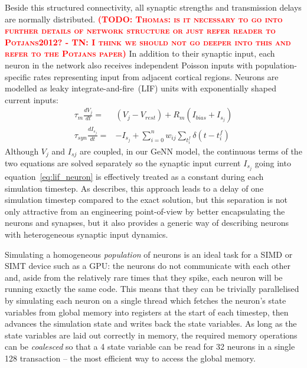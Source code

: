 \documentclass[utf8]{frontiersSCNS} %
\newcommand{\todo}[1]{\textbf{\textsc{\textcolor{red}{(TODO: #1)}}}}
\begin{document}
Beside this structured connectivity, all synaptic strengths and transmission delays are normally distributed.
\todo{Thomas: is it necessary to go into further details of network structure or just refer reader to Potjans2012? - TN: I think we should not go deeper into this and refer to the Potjans paper}
In addition to their synaptic input, each neuron in the network also receives independent Poisson inputs with population-specific rates representing input from adjacent cortical regions.
Neurons are modelled as leaky integrate-and-fire~(LIF) units with exponentially shaped current inputs:
%
\begin{align}
    \tau_{m} \frac{dV_{j}}{dt} = & (V_{j} - V_{rest}) + R_{m}(I_{bias} + I_{s_{j}}) \label{eq:lif_neuron}\\
    \tau_{syn} \frac{dI_{s_{j}}}{dt} = & -I_{s_{j}} + \sum_{i=0}^{n} w_{ij} \sum_{t_{i}^{f}}  \delta(t - t_{i}^{f})\label{eq:exp_neuron_input_current}
\end{align}
%
Although $V_{j}$ and $I_{s{j}}$ are coupled, in our GeNN model, the continuous terms of the two equations are solved separately so the synaptic input current $I_{s_{j}}$ going into equation~\ref{eq:lif_neuron} is effectively treated as a constant during each simulation timestep.
As \citet{Rotter1999} describes, this approach leads to a delay of one simulation timestep compared to the exact solution, but this separation is not only attractive from an engineering point-of-view by better encapsulating the neurons and synapses, but it also provides a generic way of describing neurons with heterogeneous synaptic input dynamics.

Simulating a homogeneous \textit{population} of neurons is an ideal task for a SIMD or SIMT device such as a GPU: the neurons do not communicate with each other and, aside from the relatively rare times that they spike, each neuron will be running exactly the same code.
This means that they can be trivially parallelised by simulating each neuron on a single thread which fetches the neuron's state variables from global memory into registers at the start of each timestep, then advances the simulation state and writes back the state variables.
As long as the state variables are laid out correctly in memory, the required memory operations can be \textit{coalesced} so that a \SI{4}{\byte} state variable can be read for \num{32} neurons in a single \SI{128}{\byte} transaction -- the most efficient way to access the global memory.
\end{document}
